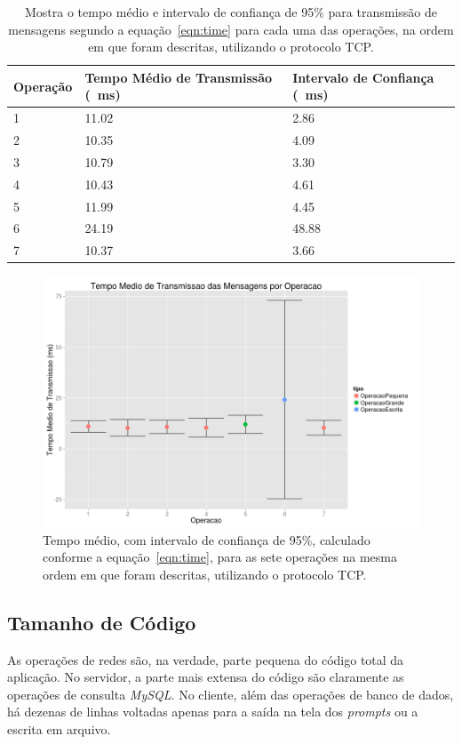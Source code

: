\documentclass[12pt,a4paper]{article}
\begin{document}
\begin{table}[h]
\centering
\caption{Mostra o tempo médio e intervalo de confiança de 95\% para transmissão de mensagens segundo a equação~\ref{eqn:time} para cada uma das operações, na ordem em que foram descritas, utilizando o protocolo TCP.}
\label{table:transmissao}
\begin{tabular}{lll}
Operação & Tempo Médio de Transmissão (\SI{}{\milli\second}) & Intervalo de Confiança (\SI{}{\milli\second}) \\ \hline
1        & 11.02                & 2.86   \\
2        & 10.35                & 4.09   \\
3        & 10.79                & 3.30   \\
4        & 10.43                & 4.61   \\
5        & 11.99                & 4.45   \\
6        & 24.19                & 48.88  \\
7        & 10.37                & 3.66  
\end{tabular}
\end{table}

\begin{figure}[h]
\centering
\includegraphics[width=\textwidth]{diagrama/resultadosTempoTransmissao.png}
\caption{Tempo médio, com intervalo de confiança de 95\%, calculado conforme a equação~\ref{eqn:time}, para as sete operações na mesma ordem em que foram descritas, utilizando o protocolo TCP.}
\label{fig:transmissao}
\end{figure}

\subsection{Tamanho de Código}
As operações de redes são, na verdade, parte pequena do código total da aplicação. No servidor, a parte mais extensa do código são claramente as operações de consulta {\it MySQL}. No cliente, além das operações de banco de dados, há dezenas de linhas voltadas apenas para a saída na tela dos {\it prompts} ou a escrita em arquivo.
\end{document}
